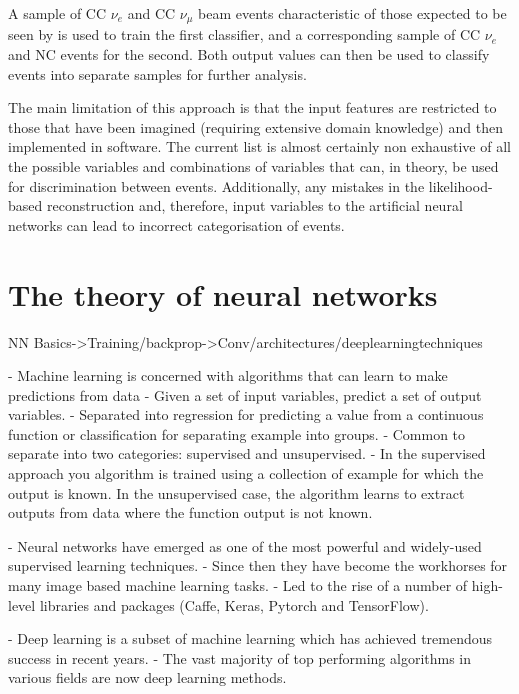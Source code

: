 A sample of CC $\nu_{e}$ and CC $\nu_{\mu}$ beam events characteristic of those expected to be
seen by \chips is used to train the first classifier, and a corresponding sample of CC $\nu_{e}$
and NC events for the second. Both output values can then be used to classify events into separate
samples for further analysis.

The main limitation of this approach is that the input features are restricted to those that have
been imagined (requiring extensive domain knowledge) and then implemented in software. The current
list is almost certainly non exhaustive of all the possible variables and combinations of
variables that can, in theory, be used for discrimination between events. Additionally, any
mistakes in the likelihood-based reconstruction and, therefore, input variables to the artificial
neural networks can lead to incorrect categorisation of events.

\section{The theory of neural networks} %
\label{sec:cvn_theory} %

NN Basics->Training/backprop->Conv/architectures/deeplearningtechniques

- Machine learning is concerned with algorithms that can learn to make predictions from data
- Given a set of input variables, predict a set of output variables.
- Separated into regression for predicting a value from a continuous function or classification
for separating example into groups.
- Common to separate into two categories: supervised and unsupervised.
- In the supervised approach you algorithm is trained using a collection of example for which the
output is known. In the unsupervised case, the algorithm learns to extract outputs from data where
the function output is not known.

- Neural networks have emerged as one of the most powerful and widely-used supervised learning
techniques.
- Since then they have become the workhorses for many image based machine learning tasks.
- Led to the rise of a number of high-level libraries and packages (Caffe, Keras, Pytorch and
TensorFlow).

- Deep learning is a subset of machine learning which has achieved tremendous success in recent
years.
- The vast majority of top performing algorithms in various fields are now deep learning methods.

